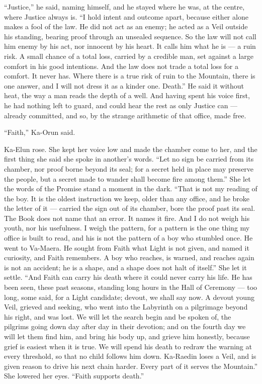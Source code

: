 ``Justice,'' he said, naming himself, and he stayed where he was, at the centre, where Justice always is. ``I hold intent and outcome apart, because either alone makes a fool of the law. He did not act as an enemy; he acted as a Veil outside his standing, bearing proof through an unsealed sequence. So the law will not call him enemy by his act, nor innocent by his heart. It calls him what he is --- a ruin risk. A small chance of a total loss, carried by a credible man, set against a large comfort in his good intentions. And the law does not trade a total loss for a comfort. It never has. Where there is a true risk of ruin to the Mountain, there is one answer, and I will not dress it as a kinder one. Death.'' He said it without heat, the way a man reads the depth of a well. And having spent his voice first, he had nothing left to guard, and could hear the rest as only Justice can --- already committed, and so, by the strange arithmetic of that office, made free.\par

``Faith,'' Ka-Orun said.\par

Ka-Elun rose. She kept her voice low and made the chamber come to her, and the first thing she said she spoke in another's words. ``Let no sign be carried from its chamber, nor proof borne beyond its seal; for a secret held in place may preserve the people, but a secret made to wander shall become fire among them.'' She let the words of the Promise stand a moment in the dark. ``That is not my reading of the boy. It is the oldest instruction we keep, older than any office, and he broke the letter of it --- carried the sign out of its chamber, bore the proof past its seal. The Book does not name that an error. It names it fire. And I do not weigh his youth, nor his usefulness. I weigh the pattern, for a pattern is the one thing my office is built to read, and his is not the pattern of a boy who stumbled once. He went to Va-Maera. He sought from Faith what Light is not given, and named it curiosity, and Faith remembers. A boy who reaches, is warned, and reaches again is not an accident; he is a shape, and a shape does not halt of itself.'' She let it settle. ``And Faith can carry his death where it could never carry his life. He has been seen, these past seasons, standing long hours in the Hall of Ceremony --- too long, some said, for a Light candidate; devout, we shall say now. A devout young Veil, grieved and seeking, who went into the Labyrinth on a pilgrimage beyond his right, and was lost. We will let the search begin and be spoken of, the pilgrims going down day after day in their devotion; and on the fourth day we will let them find him, and bring his body up, and grieve him honestly, because grief is easiest when it is true. We will spend his death to redraw the warning at every threshold, so that no child follows him down. Ka-Raedin loses a Veil, and is given reason to drive his next chain harder. Every part of it serves the Mountain.'' She lowered her eyes. ``Faith supports death.''\par

